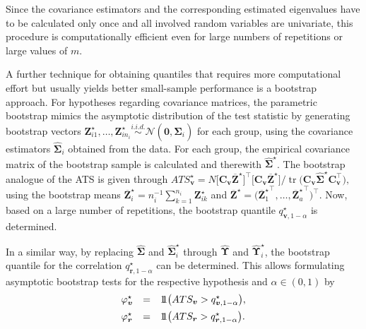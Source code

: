 Since the covariance estimators and the corresponding estimated eigenvalues
have to be calculated only once and all involved random variables are
univariate, this procedure is computationally efficient even for large numbers
of repetitions or large values of \(m\).

A further technique for obtaining quantiles that requires more computational
effort but usually yields better small-sample performance is a bootstrap
approach. For hypotheses regarding covariance matrices, the parametric
bootstrap mimics the asymptotic distribution of the test statistic by
generating bootstrap vectors
\(\boldsymbol{Z}_{i1}^\star, \dots, \boldsymbol{Z}_{in_i}^\star
\stackrel{i.i.d.}{\sim}
\mathcal{N}(\mathbf{0}, \widehat{\boldsymbol{\Sigma}}_i)\)
for each group, using the covariance estimators
\(\widehat{\boldsymbol{\Sigma}}_i\) obtained from the data. For each group, the empirical covariance matrix of the bootstrap sample is
calculated and therewith \(\widehat{\boldsymbol{\Sigma}}^\star\). The bootstrap analogue of
the ATS is given through \(ATS_{\boldsymbol{v}}^\star=
N
\bigl[
\boldsymbol{C}_{\boldsymbol{v}} \overline{\boldsymbol{Z}}^\star
\bigr]^\top
\bigl[
\boldsymbol{C}_{\boldsymbol{v}} \overline{\boldsymbol{Z}}^\star
\bigr]
\Big/
\operatorname{tr}
\bigl(
\boldsymbol{C}_{\boldsymbol{v}}
\widehat{\boldsymbol{\Sigma}}^\star
\boldsymbol{C}_{\boldsymbol{v}}^\top
\bigr),\) using the bootstrap means
\(\overline{\boldsymbol{Z}}_i^\star
=
n_i^{-1}
\sum_{k=1}^{n_i} \boldsymbol{Z}_{ik}^\star\)
and
\(\overline{\boldsymbol{Z}}^\star
=
\bigl(
{\overline{\boldsymbol{Z}}_1^\star}^\top, \dots,
{\overline{\boldsymbol{Z}}_a^\star}^\top
\bigr)^\top\). Now, based on a large number of repetitions, the bootstrap quantile
\(q_{\boldsymbol{v}, 1-\alpha}^{\star}\) is determined.

In a similar way, by replacing \(\widehat{\boldsymbol{\Sigma}}\) and \(\widehat{\boldsymbol{\Sigma}}_i^\star\) through
\(\widehat{\boldsymbol{\Upsilon}}\) and \(\widehat{\boldsymbol{\Upsilon}}_i^\star\), the bootstrap quantile
for the correlation
\(q_{\boldsymbol{r}, 1-\alpha}^{\star}\) can be determined. This allows
formulating asymptotic bootstrap tests for the respective hypothesis and
\(\alpha \in (0,1)\) by
\begin{equation}
\begin{array}{lrl}
\varphi_{\boldsymbol{v}}^{\star}
&=&
1\hspace{-0.7ex}1
\bigl(
ATS_{\boldsymbol{v}}
>
q_{\boldsymbol{v}, 1-\alpha}^{\star}
\bigr),
\\ [0.5em]
\varphi_{\boldsymbol{r}}^{\star}
&=&
1\hspace{-0.7ex}1
\bigl(
ATS_{\boldsymbol{r}}
>
q_{\boldsymbol{r}, 1-\alpha}^{\star}
\bigr).
\end{array}
\label{eq:bootstrap-tests}
\end{equation}

